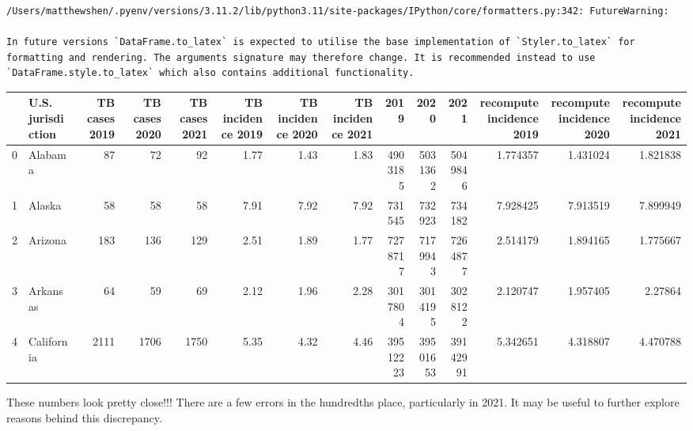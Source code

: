 \documentclass[
  letterpaper,
  DIV=11,
  numbers=noendperiod]{scrreprt}
\begin{document}
\begin{verbatim}
/Users/matthewshen/.pyenv/versions/3.11.2/lib/python3.11/site-packages/IPython/core/formatters.py:342: FutureWarning:

In future versions `DataFrame.to_latex` is expected to utilise the base implementation of `Styler.to_latex` for formatting and rendering. The arguments signature may therefore change. It is recommended instead to use `DataFrame.style.to_latex` which also contains additional functionality.
\end{verbatim}

\begin{tabular}{llrrrrrrrrrrrr}
\toprule
{} & U.S. jurisdiction &  TB cases 2019 &  TB cases 2020 &  TB cases 2021 &  TB incidence 2019 &  TB incidence 2020 &  TB incidence 2021 &      2019 &      2020 &      2021 &  recompute incidence 2019 &  recompute incidence 2020 &  recompute incidence 2021 \\
\midrule
0 &           Alabama &             87 &             72 &             92 &               1.77 &               1.43 &               1.83 &   4903185 &   5031362 &   5049846 &                  1.774357 &                  1.431024 &                  1.821838 \\
1 &            Alaska &             58 &             58 &             58 &               7.91 &               7.92 &               7.92 &    731545 &    732923 &    734182 &                  7.928425 &                  7.913519 &                  7.899949 \\
2 &           Arizona &            183 &            136 &            129 &               2.51 &               1.89 &               1.77 &   7278717 &   7179943 &   7264877 &                  2.514179 &                  1.894165 &                  1.775667 \\
3 &          Arkansas &             64 &             59 &             69 &               2.12 &               1.96 &               2.28 &   3017804 &   3014195 &   3028122 &                  2.120747 &                  1.957405 &                   2.27864 \\
4 &        California &           2111 &           1706 &           1750 &               5.35 &               4.32 &               4.46 &  39512223 &  39501653 &  39142991 &                  5.342651 &                  4.318807 &                  4.470788 \\
\bottomrule
\end{tabular}

These numbers look pretty close!!! There are a few errors in the
hundredths place, particularly in 2021. It may be useful to further
explore reasons behind this discrepancy.
\end{document}
